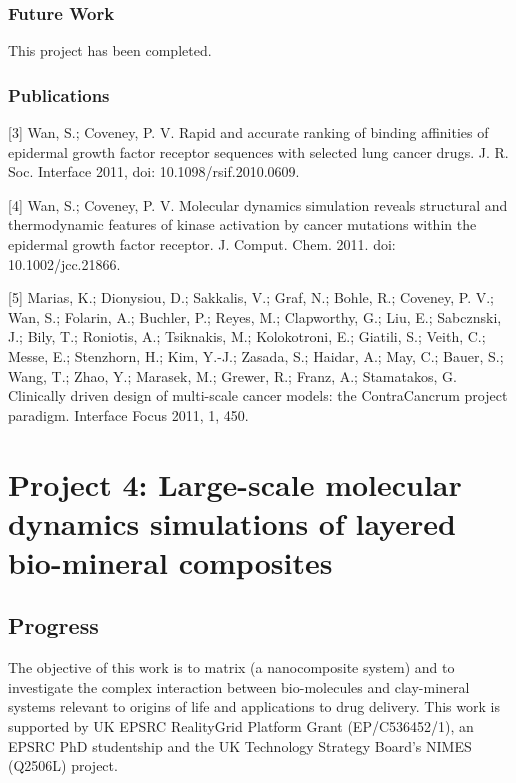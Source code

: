 \documentclass[a4paper,12pt]{article}
\begin{document}
\subsubsection{Future Work}

This project has been completed.

\subsubsection{Publications}
[3] Wan, S.; Coveney, P. V. Rapid and accurate ranking of binding affinities of epidermal growth factor receptor sequences with selected lung cancer drugs. J. R. Soc. Interface 2011, doi: 10.1098/rsif.2010.0609.

[4] Wan, S.; Coveney, P. V. Molecular dynamics simulation reveals structural and thermodynamic features of kinase activation by cancer mutations within the epidermal growth factor receptor. J. Comput. Chem. 2011. doi: 10.1002/jcc.21866.

[5] Marias, K.; Dionysiou, D.; Sakkalis, V.; Graf, N.; Bohle, R.; Coveney, P. V.; Wan, S.; Folarin, A.; Buchler, P.; Reyes, M.; Clapworthy, G.; Liu, E.; Sabcznski, J.; Bily, T.; Roniotis, A.; Tsiknakis, M.; Kolokotroni, E.; Giatili, S.; Veith, C.; Messe, E.; Stenzhorn, H.; Kim, Y.-J.; Zasada, S.; Haidar, A.; May, C.; Bauer, S.; Wang, T.; Zhao, Y.; Marasek, M.; Grewer, R.; Franz, A.; Stamatakos, G. Clinically driven design of multi-scale cancer models: the ContraCancrum project paradigm. Interface Focus 2011, 1, 450.

\section{Project 4: Large-scale molecular dynamics simulations of layered bio-mineral composites}

\subsection{Progress}

The objective of this work is to %
matrix (a nanocomposite system) and to investigate the complex interaction between bio-molecules and 
clay-mineral systems relevant to origins of life and applications to drug delivery. This work is 
supported by UK EPSRC RealityGrid Platform Grant (EP/C536452/1), an EPSRC PhD studentship and the 
UK Technology Strategy Board's NIMES (Q2506L) project.
\end{document}
